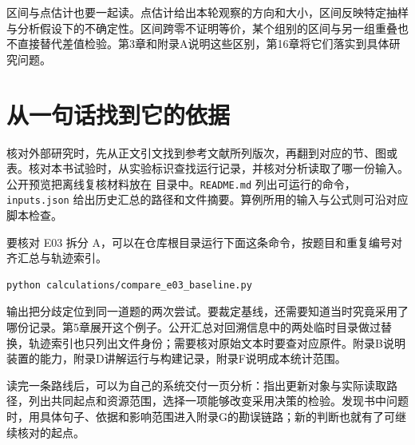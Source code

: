 区间与点估计也要一起读。点估计给出本轮观察的方向和大小，区间反映特定抽样与分析假设下的不确定性。区间跨零不证明等价，某个组别的区间与另一组重叠也不直接替代差值检验。第3章和附录A说明这些区别，第16章将它们落实到具体研究问题。

\section*{从一句话找到它的依据}

核对外部研究时，先从正文引文找到参考文献所列版次，再翻到对应的节、图或表。核对本书试验时，从实验标识查找运行记录，并核对分析读取了哪一份输入。公开预览把离线复核材料放在  目录中。\texttt{README.md} 列出可运行的命令，\texttt{inputs.json} 给出历史汇总的路径和文件摘要。算例所用的输入与公式则可沿对应脚本检查。

要核对 E03 拆分 A，可以在仓库根目录运行下面这条命令，按题目和重复编号对齐汇总与轨迹索引。
\begin{verbatim}
python calculations/compare_e03_baseline.py
\end{verbatim}
输出把分歧定位到同一道题的两次尝试。要裁定基线，还需要知道当时究竟采用了哪份记录。第5章展开这个例子。公开汇总对回溯信息中的两处临时目录做过替换，轨迹索引也只列出文件身份；需要核对原始文本时要查对应原件。附录B说明装置的能力，附录D讲解运行与构建记录，附录F说明成本统计范围。

读完一条路线后，可以为自己的系统交付一页分析：指出更新对象与实际读取路径，列出共同起点和资源范围，选择一项能够改变采用决策的检验。发现书中问题时，用具体句子、依据和影响范围进入附录G的勘误链路；新的判断也就有了可继续核对的起点。
